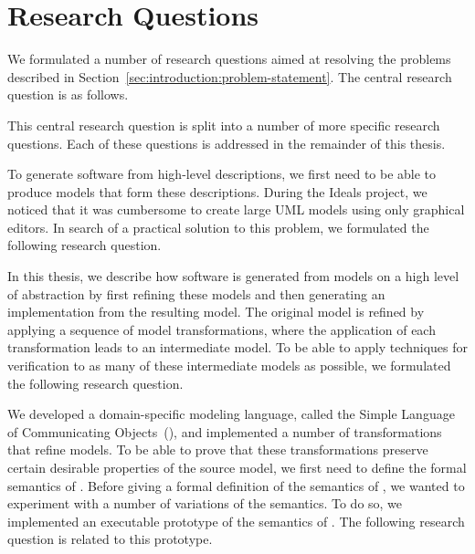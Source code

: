 \section{Research Questions}
\label{sec:introduction:research-questions}

We formulated a number of research questions aimed at resolving the problems described in Section~\ref{sec:introduction:problem-statement}.
The central research question is as follows.


\RQMain

\noindent
This central research question is split into a number of more specific research questions.
Each of these questions is addressed in the remainder of this thesis.


To generate software from high-level descriptions, we first need to be able to produce models that form these descriptions.
During the Ideals project, we noticed that it was cumbersome to create large UML models using only graphical editors.
In search of a practical solution to this problem, we formulated the following research question.

\RQOne


In this thesis, we describe how software is generated from models on a high level of abstraction by first refining these models and then generating an implementation from the resulting model.
The original model is refined by applying a sequence of model transformations, where the application of each transformation leads to an intermediate model.
To be able to apply techniques for verification to as many of these intermediate models as possible, we formulated the following research question.

\RQTwo


We developed a domain-specific modeling language, called the Simple Language of Communicating Objects~(\SLCO), and implemented a number of transformations that refine \SLCO models.
To be able to prove that these transformations preserve certain desirable properties of the source model, we first need to define the formal semantics of \SLCO.
Before giving a formal definition of the semantics of \SLCO, we wanted to experiment with a number of variations of the semantics.
To do so, we implemented an executable prototype of the semantics of \SLCO.
The following research question is related to this prototype.


